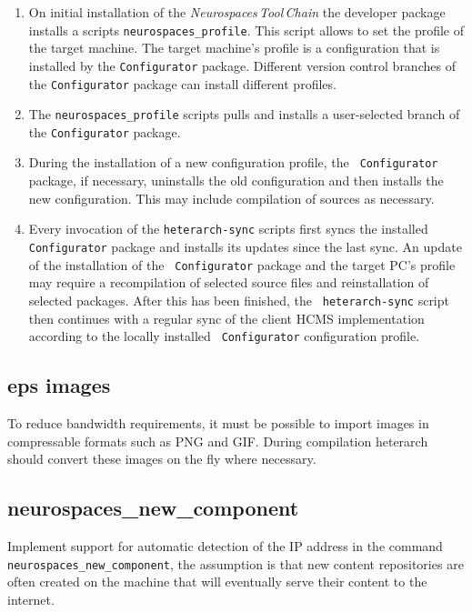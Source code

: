 \documentclass[12pt]{article}
\begin{document}
\begin{enumerate}
\item On initial installation of the {\it Neurospaces\,Tool\,Chain}
  the developer package installs a scripts {\tt neurospaces\_profile}.
  This script allows to set the profile of the target machine.  The
  target machine's profile is a configuration that is installed by the
  {\tt Configurator} package.  Different version control branches of
  the {\tt Configurator} package can install different profiles.
\item The {\tt neurospaces\_profile} scripts pulls and installs a
  user-selected branch of the {\tt Configurator} package.
\item During the installation of a new configuration profile, the {\tt
    Configurator} package, if necessary, uninstalls the old
  configuration and then installs the new configuration.  This may
  include compilation of sources as necessary.
\item Every invocation of the {\tt heterarch-sync} scripts first syncs
  the installed {\tt Configurator} package and installs its updates
  since the last sync.  An update of the installation of the {\tt
    Configurator} package and the target PC's profile may require a
  recompilation of selected source files and reinstallation of
  selected packages.  After this has been finished, the {\tt
    heterarch-sync} script then continues with a regular sync of the
  client HCMS implementation according to the locally installed {\tt
    Configurator} configuration profile.
\end{enumerate}

\subsection{eps images}

To reduce bandwidth requirements, it must be possible to import images
in compressable formats such as PNG and GIF.  During compilation
heterarch should convert these images on the fly where necessary.


\subsection{neurospaces\_new\_component}

Implement support for automatic detection of the IP address in the
command {\tt neurospaces\_new\_component}, the assumption is that new
content repositories are often created on the machine that will
eventually serve their content to the internet.
\end{document}
